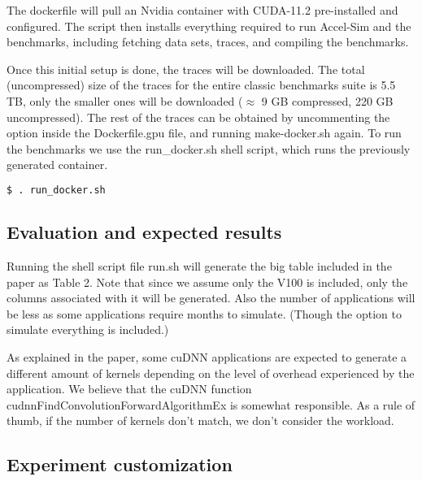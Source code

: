 \documentclass{sigplanconf}
\begin{document}
{The dockerfile will pull an Nvidia container with CUDA-11.2 pre-installed and configured. 
The script then installs everything required to run Accel-Sim and the benchmarks, including 
fetching data sets, traces, and compiling the benchmarks. 

Once this initial setup is done, the traces will be downloaded. The total (uncompressed) size of 
the traces for the entire classic benchmarks suite is 5.5 TB, only the smaller ones will be downloaded 
($\approx$ 9 GB compressed, 220 GB uncompressed). The rest of the traces can be obtained by 
uncommenting the option inside the Dockerfile.gpu file, and running make-docker.sh again.
To run the benchmarks we use the run\_docker.sh shell script, which runs the previously generated container.

\begin{lstlisting}[language=bash]
  $ . run_docker.sh
\end{lstlisting}




\subsection{Evaluation and expected results}

Running the shell script file run.sh will generate the big table included in the paper as Table 2.
Note that since we assume only the V100 is included, only the columns associated with it will be 
generated. Also the number of applications will be less as some applications require 
months to simulate. (Though the option to simulate everything is included.)

As explained in the paper, some cuDNN applications are expected to generate a different amount of kernels
depending on the level of overhead experienced by the application. We believe that the cuDNN function 
cudnnFindConvolutionForwardAlgorithmEx is somewhat responsible. As a rule of thumb, if the number 
of kernels don't match, we don't consider the workload.


\subsection{Experiment customization}

}
\end{document}
